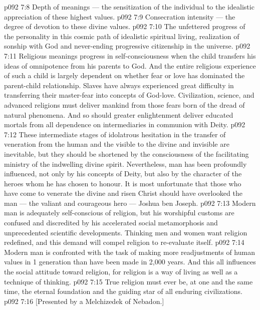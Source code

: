 \vs p092 7:8 \bibnobreakspace Depth of meanings --- the sensitization of the individual to the idealistic appreciation of these highest values.
\vs p092 7:9 \bibnobreakspace Consecration intensity --- the degree of devotion to these divine values.
\vs p092 7:10 \bibnobreakspace The unfettered progress of the personality in this cosmic path of idealistic spiritual living, realization of sonship with God and never\hyp{}ending progressive citizenship in the universe.
\vs p092 7:11 \pc Religious meanings progress in self\hyp{}consciousness when the child transfers his ideas of omnipotence from his parents to God. And the entire religious experience of such a child is largely dependent on whether fear or love has dominated the parent\hyp{}child relationship. Slaves have always experienced great difficulty in transferring their master\hyp{}fear into concepts of God\hyp{}love. Civilization, science, and advanced religions must deliver mankind from those fears born of the dread of natural phenomena. And so should greater enlightenment deliver educated mortals from all dependence on intermediaries in communion with Deity.
\vs p092 7:12 These intermediate stages of idolatrous hesitation in the transfer of veneration from the human and the visible to the divine and invisible are inevitable, but they should be shortened by the consciousness of the facilitating ministry of the indwelling divine spirit. Nevertheless, man has been profoundly influenced, not only by his concepts of Deity, but also by the character of the heroes whom he has chosen to honour. It is most unfortunate that those who have come to venerate the divine and risen Christ should have overlooked the man --- the valiant and courageous hero --- Joshua ben Joseph.
\vs p092 7:13 \pc Modern man is adequately self\hyp{}conscious of religion, but his worshipful customs are confused and discredited by his accelerated social metamorphosis and unprecedented scientific developments. Thinking men and women want religion redefined, and this demand will compel religion to re\hyp{}evaluate itself.
\vs p092 7:14 Modern man is confronted with the task of making more readjustments of human values in 1 generation than have been made in 2,000 years. And this all influences the social attitude toward religion, for religion is a way of living as well as a technique of thinking.
\vs p092 7:15 \pc True religion must ever be, at one and the same time, the eternal foundation and the guiding star of all enduring civilizations.
\vsetoff
\vs p092 7:16 [Presented by a Melchizedek of Nebadon.]
